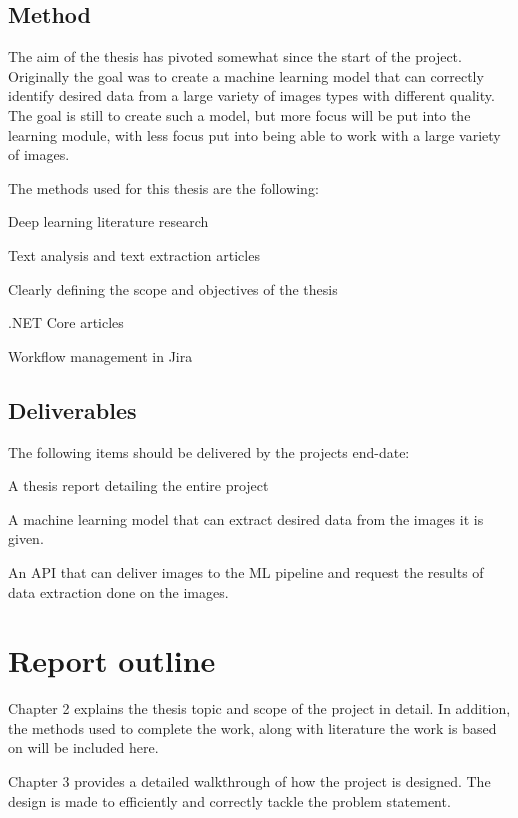 \subsection{Method}\label{subsec:method}
The aim of the thesis has pivoted somewhat since the start of the project.
Originally the goal was to create a machine learning model that can correctly identify desired data from a large variety of images types with different quality.
The goal is still to create such a model, but more focus will be put into the learning module, with less focus put into being able to work with a large variety of images.

The methods used for this thesis are the following:
\begin{compactitem}
    \item Deep learning literature research
    \item Text analysis and text extraction articles
    \item Clearly defining the scope and objectives of the thesis
    \item .NET Core articles
    \item Workflow management in Jira
\end{compactitem}

\subsection{Deliverables}\label{subsec:deliverables}
The following items should be delivered by the projects end-date:
\begin{compactitem}
    \item A thesis report detailing the entire project
    \item A machine learning model that can extract desired data from the images it is given.
    \item An API that can deliver images to the ML pipeline and request the results of data extraction done on the images.
\end{compactitem}

\section{Report outline}\label{sec:report-outline}
Chapter 2 explains the thesis topic and scope of the project in detail.
In addition, the methods used to complete the work, along with literature the work is based on will be included here.

Chapter 3 provides a detailed walkthrough of how the project is designed.
The design is made to efficiently and correctly tackle the problem statement.

